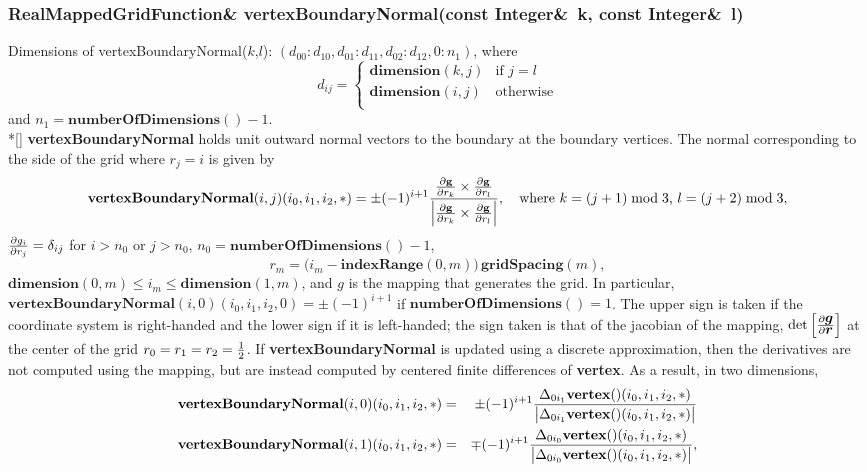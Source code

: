 \documentclass{article}
\begin{document}
  \subsubsection{RealMappedGridFunction\& vertexBoundaryNormal(const Integer\&~k, const Integer\&~l)}
  \label{MappedGrid::vertexBoundaryNormal(k,l)}
    Dimensions of vertexBoundaryNormal($k$,$l$): $(d_{00}\colon d_{10},d_{01}\colon d_{11},d_{02}\colon d_{12},0\colon n_1)$,
    where \[d_{ij} = \left\{ \begin{array}{ll}
      \textbf{dimension}(k,j) & \mbox{if $j=l$}  \\
      \textbf{dimension}(i,j) & \mbox{otherwise} \\
    \end{array} \right. \]
    and $n_1 = \textbf{numberOfDimensions}() - 1$. \\*[\parskip]
    \textbf{vertexBoundaryNormal} holds unit outward normal vectors to the boundary at the boundary vertices.
    The normal corresponding to the side of the grid where $r_j=i$ is given by
    \[
      \textbf{vertexBoundaryNormal}(i,j)(i_0,i_1,i_2,\ast) = \pm (-1)^{i+1}
      {{\partial \textbf{g} \over \partial r_k} \times {\partial \textbf{g} \over \partial r_l} \over
      \Big|{\partial \textbf{g} \over \partial r_k} \times {\partial \textbf{g} \over \partial r_l}\Big|},
      \quad\mbox{where $k=(j+1)\bmod3$, $l=(j+2)\bmod3$},
    \]
    ${\partial g_i \over \partial r_j} = \delta_{ij}$ for $i>n_0$ or $j>n_0$, $n_0=\textbf{numberOfDimensions}()-1$,
    \[
      r_m = \big(i_m - \textbf{indexRange}(0,m)\big)\,\textbf{gridSpacing}(m),
    \]
    $\textbf{dimension}(0,m) \le i_m \le \textbf{dimension}(1,m)$, and {\boldmath $g$} is the mapping that generates the grid.
    In particular, $\textbf{vertexBoundaryNormal}(i,0)(i_0,i_1,i_2,0)=\pm(-1)^{i+1}$ if $\textbf{numberOfDimensions}()=1$.
    The upper sign is taken if the coordinate system is right-handed and the lower sign if it is left-handed;
    the sign taken is that of the jacobian of the mapping, $\det\Big[{\partial\mbox{\boldmath$g$} \over \partial\mbox{\boldmath$r$}}\Big]$
    at the center of the grid $r_0=r_1=r_2={1\over2}$.
    If \textbf{vertexBoundaryNormal} is updated using a discrete approximation, then the derivatives are not computed
    using the mapping, but are instead computed by centered finite differences of \textbf{vertex}.  As a result, in two dimensions,
    \begin{eqnarray*}
      \textbf{vertexBoundaryNormal}(i,0)(i_0,i_1,i_2,\ast) & = & \pm (-1)^{i+1} {\Delta_{0i_1} \textbf{vertex}()(i_0,i_1,i_2,\ast) \over
                                                                              \big| \Delta_{0i_1} \textbf{vertex}()(i_0,i_1,i_2,\ast) \big|}  \\
      \textbf{vertexBoundaryNormal}(i,1)(i_0,i_1,i_2,\ast) & = & \mp (-1)^{i+1} {\Delta_{0i_0} \textbf{vertex}()(i_0,i_1,i_2,\ast) \over
                                                                              \big| \Delta_{0i_0} \textbf{vertex}()(i_0,i_1,i_2,\ast) \big|}, \\
    \end{eqnarray*}
\end{document}
